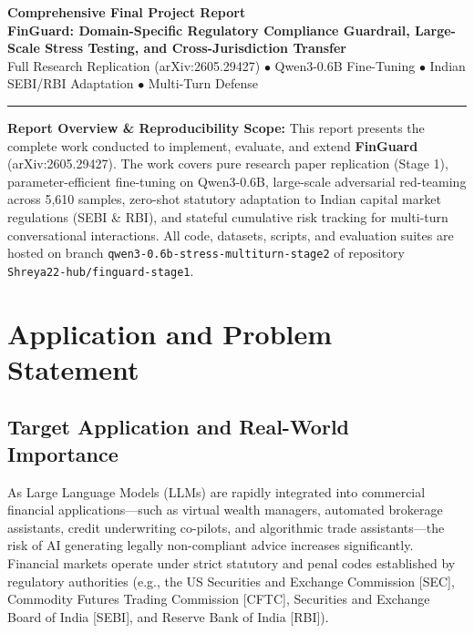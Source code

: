 \documentclass[11pt,a4paper]{article}
\begin{document}
\begin{flushleft}
    {\large\bfseries\color{accentblue} Comprehensive Final Project Report}\\[0.3em]
    {\huge\bfseries\color{headerblue} FinGuard: Domain-Specific Regulatory Compliance Guardrail, Large-Scale Stress Testing, and Cross-Jurisdiction Transfer}\\[0.5em]
    {\large\color{gray} Full Research Replication (arXiv:2605.29427) $\bullet$ Qwen3-0.6B Fine-Tuning $\bullet$ Indian SEBI/RBI Adaptation $\bullet$ Multi-Turn Defense}\\[0.8em]
    \rule{\linewidth}{1.5pt}
\end{flushleft}

\begin{calloutbox}
\textbf{Report Overview \& Reproducibility Scope:}
This report presents the complete work conducted to implement, evaluate, and extend \textbf{FinGuard} (arXiv:2605.29427). The work covers pure research paper replication (Stage 1), parameter-efficient fine-tuning on Qwen3-0.6B, large-scale adversarial red-teaming across 5,610 samples, zero-shot statutory adaptation to Indian capital market regulations (SEBI \& RBI), and stateful cumulative risk tracking for multi-turn conversational interactions. All code, datasets, scripts, and evaluation suites are hosted on branch \texttt{qwen3-0.6b-stress-multiturn-stage2} of repository \texttt{Shreya22-hub/finguard-stage1}.
\end{calloutbox}

\vspace{0.3em}

\section{Application and Problem Statement}

\subsection{Target Application and Real-World Importance}
As Large Language Models (LLMs) are rapidly integrated into commercial financial applications---such as virtual wealth managers, automated brokerage assistants, credit underwriting co-pilots, and algorithmic trade assistants---the risk of AI generating legally non-compliant advice increases significantly. Financial markets operate under strict statutory and penal codes established by regulatory authorities (e.g., the US Securities and Exchange Commission [SEC], Commodity Futures Trading Commission [CFTC], Securities and Exchange Board of India [SEBI], and Reserve Bank of India [RBI]). 
\end{document}
